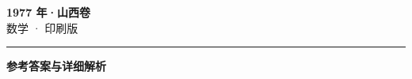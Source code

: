 \documentclass[zihao=5, a4paper]{ctexart}
\begin{document}
\begin{center}
  {\Large\bfseries 1977 年·山西卷}\\[4pt]
  {\large 数学 · 印刷版}
\end{center}
\medskip
{}

\par\bigskip\hrule\bigskip
{}
\begin{center}{\large\bfseries 参考答案与详细解析}\end{center}
\smallskip

\end{document}
